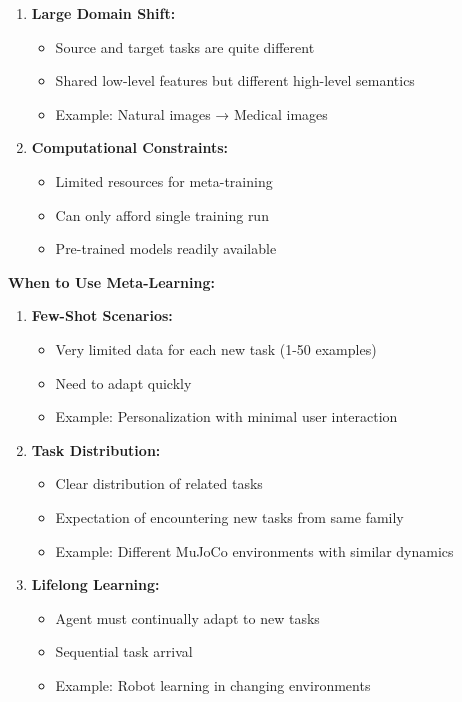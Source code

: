 \documentclass[12pt]{article}
\newcommand{\ieee}[1]{\textcolor{IEEEBlue}{\textbf{#1}}}
\begin{document}
{{\begin{enumerate}
				\item \textbf{Large Domain Shift:}
				\begin{itemize}
					\item Source and target tasks are quite different
					\item Shared low-level features but different high-level semantics
					\item Example: Natural images → Medical images
				\end{itemize}
				
				\item \textbf{Computational Constraints:}
				\begin{itemize}
					\item Limited resources for meta-training
					\item Can only afford single training run
					\item Pre-trained models readily available
				\end{itemize}
			\end{enumerate}
			
			\ieee{When to Use Meta-Learning:}
			
			\begin{enumerate}
				\item \textbf{Few-Shot Scenarios:}
				\begin{itemize}
					\item Very limited data for each new task (1-50 examples)
					\item Need to adapt quickly
					\item Example: Personalization with minimal user interaction
				\end{itemize}
				
				\item \textbf{Task Distribution:}
				\begin{itemize}
					\item Clear distribution of related tasks
					\item Expectation of encountering new tasks from same family
					\item Example: Different MuJoCo environments with similar dynamics
				\end{itemize}
				
				\item \textbf{Lifelong Learning:}
				\begin{itemize}
					\item Agent must continually adapt to new tasks
					\item Sequential task arrival
					\item Example: Robot learning in changing environments
				\end{itemize}
				

\end{enumerate}}}
\end{document}
